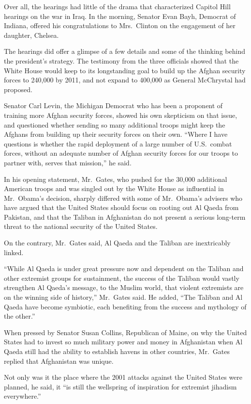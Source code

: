﻿\documentclass[12pt]{article}
\begin{document}
Over all, the hearings had little of the drama that characterized Capitol Hill hearings on the war
in Iraq. In the morning, Senator Evan Bayh, Democrat of Indiana, offered his congratulations to
Mrs.~Clinton on the engagement of her daughter, Chelsea.

The hearings did offer a glimpse of a few details and some of the thinking behind the president's
strategy. The testimony from the three officials showed that the White House would keep to its
longstanding goal to build up the Afghan security forces to 240,000 by 2011, and not expand to
400,000 as General McChrystal had proposed.

Senator Carl Levin, the Michigan Democrat who has been a proponent of training more Afghan security
forces, showed his own skepticism on that issue, and questioned whether sending so many additional
troops might keep the Afghans from building up their security forces on their own. ``Where I have
questions is whether the rapid deployment of a large number of U.S.~combat forces, without an
adequate number of Afghan security forces for our troops to partner with, serves that mission,'' he
said.

In his opening statement, Mr.~Gates, who pushed for the 30,000 additional American troops and was
singled out by the White House as influential in Mr.~Obama's decision, sharply differed with some of
Mr.~Obama's advisers who have argued that the United States should focus on rooting out Al Qaeda
from Pakistan, and that the Taliban in Afghanistan do not present a serious long-term threat to the
national security of the United States.

On the contrary, Mr.~Gates said, Al Qaeda and the Taliban are inextricably linked.

``While Al Qaeda is under great pressure now and dependent on the Taliban and other extremist groups
for sustainment, the success of the Taliban would vastly strengthen Al Qaeda's message, to the
Muslim world, that violent extremists are on the winning side of history,'' Mr.~Gates said. He
added, ``The Taliban and Al Qaeda have become symbiotic, each benefiting from the success and
mythology of the other.''

When pressed by Senator Susan Collins, Republican of Maine, on why the United States had to invest
so much military power and money in Afghanistan when Al Qaeda still had the ability to establish
havens in other countries, Mr.~Gates replied that Afghanistan was unique.

Not only was it the place where the 2001 attacks against the United States were planned, he said, it
``is still the wellspring of inspiration for extremist jihadism everywhere.''
\end{document}
